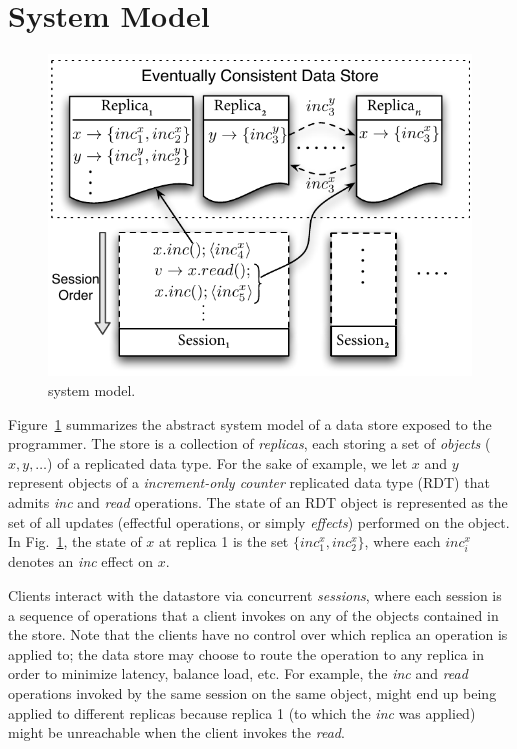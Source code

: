 \section{System Model}
\label{sec:sysmod}

\begin{figure}
\centering
\includegraphics[scale=0.9]{Figures/SystemModel}
\caption{\name system model.}
\label{fig:sysmod}
\end{figure}

Figure~\ref{fig:sysmod} summarizes the abstract system model of a data
store exposed to the \name programmer. The store is a collection of
\emph{replicas}, each storing a set of \emph{objects} ($x,y,\ldots$)
of a replicated data type. For the sake of example, we let $x$ and $y$
represent objects of a \emph{increment-only counter} replicated data
type (RDT) that admits \emph{inc} and \emph{read} operations. The
state of an RDT object is represented as the set of all updates
(effectful operations, or simply \emph{effects}) performed on the
object. In Fig.~\ref{fig:sysmod}, the state of $x$ at replica 1 is the
set $\{inc^x_1,inc^x_2\}$, where each $inc^x_i$ denotes an \emph{inc}
effect on $x$. 

Clients interact with the datastore via concurrent \emph{sessions},
where each session is a sequence of operations that a client invokes
on any of the objects contained in the store. Note that the clients
have no control over which replica an operation is applied to; the
data store may choose to route the operation to any replica in order
to minimize latency, balance load, etc. For example, the \emph{inc}
and \emph{read} operations invoked by the same session on the same
object, might end up being applied to different replicas because
replica 1 (to which the \emph{inc} was applied) might be unreachable
when the client invokes the \emph{read}. 

